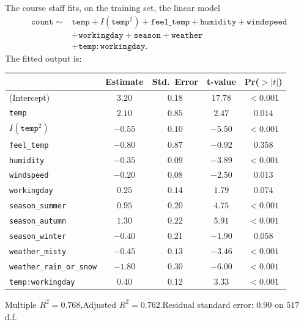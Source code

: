 \documentclass[11pt,a4paper]{article}
\begin{document}
The course staff fits, on the training set, the linear model
\begin{align*}
\texttt{count} \;\sim\; & \texttt{temp} + I(\texttt{temp}^2) + \texttt{feel\_temp} + \texttt{humidity} + \texttt{windspeed} \\
 & + \texttt{workingday} + \texttt{season} + \texttt{weather} \\
 & + \texttt{temp}\!:\!\texttt{workingday}.
\end{align*}
The fitted output is:

\begin{center}\small
\begin{tabular}{lcccc}
\toprule
 & \textbf{Estimate} & \textbf{Std.\ Error} & \textbf{t-value} & \textbf{Pr($>|t|$)} \\
\midrule
(Intercept)                        & $3.20$    & $0.18$  & $17.78$  & $<0.001$ \\
\texttt{temp}                      & $2.10$    & $0.85$  & $2.47$   & $0.014$  \\
$I(\texttt{temp}^2)$               & $-0.55$   & $0.10$  & $-5.50$  & $<0.001$ \\
\texttt{feel\_temp}                & $-0.80$   & $0.87$  & $-0.92$  & $0.358$  \\
\texttt{humidity}                  & $-0.35$   & $0.09$  & $-3.89$  & $<0.001$ \\
\texttt{windspeed}                 & $-0.20$   & $0.08$  & $-2.50$  & $0.013$  \\
\texttt{workingday}                & $0.25$    & $0.14$  & $1.79$   & $0.074$  \\
\texttt{season\_summer}            & $0.95$    & $0.20$  & $4.75$   & $<0.001$ \\
\texttt{season\_autumn}            & $1.30$    & $0.22$  & $5.91$   & $<0.001$ \\
\texttt{season\_winter}            & $-0.40$   & $0.21$  & $-1.90$  & $0.058$  \\
\texttt{weather\_misty}            & $-0.45$   & $0.13$  & $-3.46$  & $<0.001$ \\
\texttt{weather\_rain\_or\_snow}   & $-1.80$   & $0.30$  & $-6.00$  & $<0.001$ \\
\texttt{temp:workingday}           & $0.40$    & $0.12$  & $3.33$   & $<0.001$ \\
\bottomrule
\end{tabular}
\end{center}

\noindent Multiple $R^2 = 0.768$,\quad Adjusted $R^2 = 0.762$.\quad Residual standard error: $0.90$ on $517$ d.f.
\end{document}
